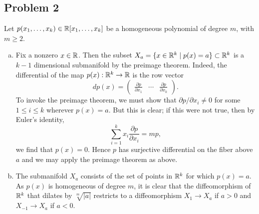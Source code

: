 \documentclass{../mathnotes}
\begin{document}
\subsection*{Problem 2}
Let $p(x_1,\ldots,x_k)\in\mathbb{R}[x_1,\ldots,x_k]$ be a homogeneous polynomial of degree $m$, with
$m\geq 2$.
\begin{enumerate}[(a)]
    \item Fix a nonzero $x\in\mathbb{R}$. Then the subset $X_a=\{x\in\mathbb{R}^k\mid p(x)=a\}\subset\mathbb{R}^k$
        is a $k-1$ dimensional submanifold by the preimage theorem. Indeed, the differential
        of the map $p(x):\mathbb{R}^k\to\mathbb{R}$ is the row vector
        \begin{equation*}
            dp(x)=
            \begin{pmatrix}
                \frac{\partial p}{\partial x_1} & \cdots & \frac{\partial p}{\partial x_k}
            \end{pmatrix}.
        \end{equation*}
        To invoke the preimage theorem, we must show that $\partial p/\partial x_i\neq 0$ for
        some $1\leq i\leq k$ wherever $p(x)=a$. But this is clear; if this were not true, then by
        Euler's identity,
        \begin{equation*}
            \sum_{i=1}^kx_i\frac{\partial p}{\partial x_i}=mp,
        \end{equation*}
        we find that $p(x)=0$. Hence $p$ has surjective differential on the fiber above $a$ and
        we may apply the preimage theorem as above.
    \item The submanifold $X_a$ consists of the set of points in $\mathbb{R}^k$ for which $p(x)=a$.
        As $p(x)$ is homogeneous of degree $m$, it is clear that the diffeomorphism of $\mathbb{R}^k$ that dilates
        by $\sqrt[m]{|a|}$ restricts to a diffeomorphism $X_1\to X_a$ if $a>0$ and $X_{-1}\to X_a$
        if $a<0$.
\end{enumerate}
\end{document}
